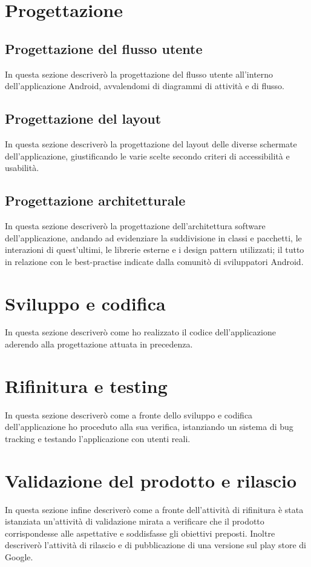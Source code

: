\section{Progettazione}

\subsection{Progettazione del flusso utente}

In questa sezione descriverò la progettazione del flusso utente all'interno dell'applicazione Android, avvalendomi di diagrammi di attività e di flusso.

\subsection{Progettazione del layout}

In questa sezione descriverò la progettazione del layout delle diverse schermate dell'applicazione, giustificando le varie scelte secondo criteri di accessibilità e usabilità.

\subsection{Progettazione architetturale}

In questa sezione descriverò la progettazione dell'architettura software dell'applicazione, andando ad evidenziare la suddivisione in classi e pacchetti, le interazioni di quest'ultimi, le librerie esterne e i design pattern utilizzati; il tutto in relazione con le best-practise indicate dalla comunitò di sviluppatori Android.

\section{Sviluppo e codifica}

In questa sezione descriverò come ho realizzato il codice dell'applicazione aderendo alla progettazione attuata in precedenza.

\section{Rifinitura e testing}

In questa sezione descriverò come a fronte dello sviluppo e codifica dell'applicazione ho proceduto alla sua verifica, istanziando un sistema di bug tracking e testando l'applicazione con utenti reali.

\section{Validazione del prodotto e rilascio}

In questa sezione infine descriverò come a fronte dell'attività di rifinitura è stata istanziata un'attività di validazione mirata a verificare che il prodotto corrispondesse alle aspettative e soddisfasse gli obiettivi preposti. Inoltre descriverò l'attività di rilascio e di pubblicazione di una versione sul play store di Google.